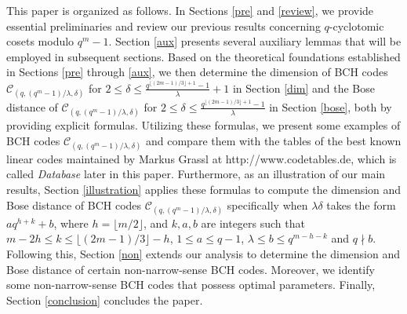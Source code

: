 \documentclass[journal,onecolumn]{IEEEtran}
\begin{document}
This paper is organized as follows.
In Sections \ref{pre} and \ref{review}, we provide essential preliminaries and review our previous results concerning $q$-cyclotomic cosets modulo $q^m-1$. Section \ref{aux} presents several auxiliary lemmas that will be employed in subsequent sections.
Based on the theoretical foundations established in Sections \ref{pre} through \ref{aux}, 
we then determine the dimension of  BCH codes $\mathcal{C}_{(q,(q^m-1)/\lambda,\delta)}$ for $2\leq \delta \leq \frac{q^{\lfloor (2m-1)/3\rfloor+1}-1}{\lambda} +1 $ in Section \ref{dim} and the Bose distance of $\mathcal{C}_{(q,(q^m-1)/\lambda,\delta)}$ for $2\leq \delta \leq \frac{q^{\lfloor (2m-1)/3\rfloor+1}-1}{\lambda}$ in Section \ref{bose}, both by providing explicit formulas. Utilizing these  formulas, we present some  examples of BCH codes $\mathcal{C}_{(q,(q^m-1)/\lambda,\delta)}$  and compare them with the tables of the best known linear codes maintained by Markus Grassl at http://www.codetables.de, which is called \textit{Database} later in this paper.
Furthermore, as an illustration of our main results, Section \ref{illustration} applies these formulas to compute the dimension and Bose distance of BCH codes $\mathcal{C}_{(q,(q^m-1)/\lambda,\delta)}$ specifically when $\lambda \delta$ takes the form $aq^{h+k}+b$, where $h=\lfloor m/2\rfloor$, and $k, a, b$ are integers such that  $m - 2h \leq k \leq \lfloor (2m - 1)/3 \rfloor - h$, $1 \leq a \leq q - 1$, $\lambda \leq b \leq q^{m - h - k}$ and $q \nmid b$.
Following this, Section \ref{non} extends our analysis to determine the dimension and Bose distance of certain non-narrow-sense BCH codes. Moreover, we identify some non-narrow-sense BCH codes that possess optimal parameters.  Finally, Section \ref{conclusion} concludes the paper.
\end{document}
